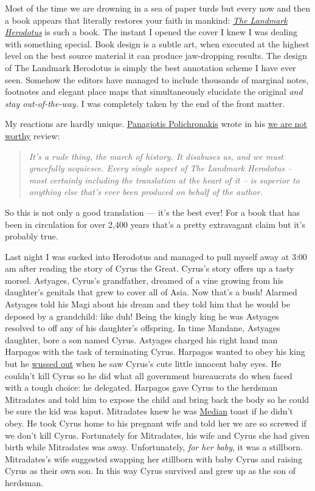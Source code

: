 Most of the time we are drowning in a sea of paper turds but every now
and then a book appears that literally restores your faith in mankind:
\emph{\href{http://www.amazon.com/Landmark-Herodotus-Histories/dp/0375421092}{The
Landmark Herodotus}} is such a
book. %
The instant I opened the cover I knew I was dealing with something
special. Book design is a subtle art, when executed at the highest level
on the best source material it can produce jaw-dropping results. The
design of The Landmark Herodotus is simply the best annotation scheme I
have ever seen. Somehow the editors have managed to include thousands of
marginal notes, footnotes and elegant place maps that simultaneously
elucidate the original \emph{and stay out-of-the-way.} I was completely
taken by the end of the front matter.

My reactions are hardly unique.
\href{http://www.openlettersmonthly.com/december-landfall/}{Panagiotis
Polichronakis} wrote in his
\href{http://www.youtube.com/watch?v=-FucbvoFFy0}{we are not worthy}
review:
\begin{quotation}
\emph{It's a rude thing, the march of history. It disabuses us, and we
must gracefully acquiesce. Every single aspect of The Landmark Herodotus
-- most certainly including the translation at the heart of it -- is
superior to anything else that's ever been produced on behalf of the
author.}
\end{quotation}
So this is not only a good translation --- it's the best ever! For a
book that has been in circulation for over 2,400 years that's a pretty
extravagant claim but it's probably true.

Last night I was sucked into Herodotus and managed to pull myself away
at 3:00 am after reading the story of Cyrus the Great. Cyrus's story
offers up a tasty morsel. Astyages, Cyrus's grandfather, dreamed of a
vine growing from his daughter's genitals that grew to cover all of
Asia. Now that's a bush! Alarmed Astyages told his Magi about his dream
and they told him that he would be deposed by a grandchild: like duh!
Being the kingly king he was Astyages resolved to off any of his
daughter's offspring. In time Mandane, Astyages daughter, bore a son
named Cyrus. Astyages charged his right hand man Harpagos with the task
of terminating Cyrus. Harpagos wanted to obey his king but he
\href{http://en.wiktionary.org/wiki/wuss\_out}{wussed out} when he saw
Cyrus's cute little innocent baby eyes. He couldn't kill Cyrus so he did
what all government bureaucrats do when faced with a tough choice: he
delegated. Harpagos gave Cyrus to the herdsman Mitradates and told him
to expose the child and bring back the body so he could be sure the kid
was kaput. Mitradates knew he was
\href{http://www.iranchamber.com/history/median/median.php}{Median}
toast if he didn't obey. He took Cyrus home to his pregnant wife and
told her we are so screwed if we don't kill Cyrus. Fortunately for
Mitradates, his wife and Cyrus she had given birth while Mitradates was
away. Unfortunately, \emph{for her baby}, it was a stillborn.
Mitradates's wife suggested swapping her stillborn with baby Cyrus and
raising Cyrus as their own son. In this way Cyrus survived and grew up
as the son of herdsman.

